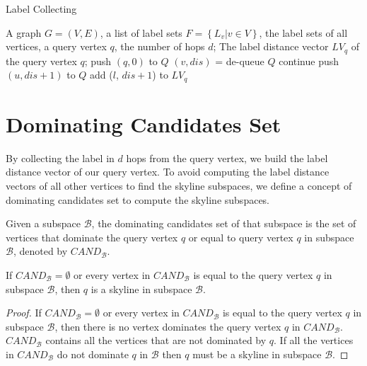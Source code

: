 \begin{algorithm}[H]
  \caption{Label Collecting}
  \label{algo:graph_collect}
  \begin{algorithmic}[1]
  \show\LOOP
    \REQUIRE A graph $G=(V,E)$, a list of label sets $F=\left\{L_v | v \in V\right\}$, the label sets of all vertices, a query vertex $q$, the number of hops $d$;
    \ENSURE The label distance vector $LV_q$ of the query vertex $q$;
    \STATE push $\left(q, 0\right)$ to $Q$
        \STATE $\left( v, dis\right)$ = de-queue $Q$
            \STATE continue
        \ENDIF
            \STATE push $\left(u, dis+1\right)$ to $Q$
                    \STATE add ($l$, $dis+1$) to $LV_q$
                \ENDIF
            \ENDFOR
        \ENDFOR
    \ENDWHILE
  \end{algorithmic}
\end{algorithm}

\section{Dominating Candidates Set}
\label{sec:dom-cand}

By collecting the label in $d$ hops from the query vertex, we build the label distance vector of our query vertex. To avoid computing the label distance vectors of all other vertices to find the skyline subspaces, we define a concept of dominating candidates set to compute the skyline subspaces.

\begin{definition}
Given a subspace $\mathcal{B}$, the dominating candidates set of that subspace is the set of vertices that dominate the query vertex $q$ or equal to query vertex $q$ in subspace $\mathcal{B}$, denoted by $\mathit{CAND}_\mathcal{B}$.
\end{definition}

\begin{property}
\label{ppt:empty_cand}
If $\mathit{CAND}_\mathcal{B} = \emptyset$ or every vertex in $\mathit{CAND}_\mathcal{B}$ is equal to the query vertex $q$ in subspace $\mathcal{B}$, then $q$ is a skyline in subspace $\mathcal{B}$.
\end{property}

\begin{proof}
If $\mathit{CAND}_\mathcal{B} = \emptyset$ or every vertex in $\mathit{CAND}_\mathcal{B}$ is equal to the query vertex $q$ in subspace $\mathcal{B}$, then there is no vertex dominates the query vertex $q$ in $\mathit{CAND}_\mathcal{B}$.
$\mathit{CAND}_\mathcal{B}$ contains all the vertices that are not dominated by $q$. If all the vertices in $\mathit{CAND}_\mathcal{B}$ do not dominate $q$ in $\mathcal{B}$ then $q$ must be a skyline in subspace $\mathcal{B}$.
\end{proof}

